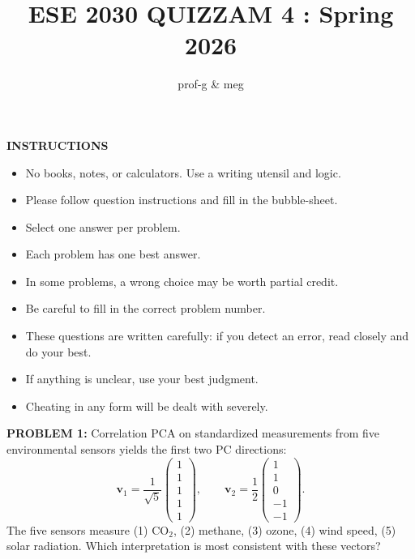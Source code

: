 \documentclass[12pt]{amsart}
\title{ESE 2030 QUIZZAM 4 : Spring 2026}
\author{prof-g \& meg}
\begin{document}
\maketitle

\begin{center}
    {\bf INSTRUCTIONS}
\end{center}

\begin{itemize}
\item 
No books, notes, or calculators. Use a writing utensil and logic. 

\item 
Please follow question instructions and fill in the bubble-sheet. 

\item 
Select one answer per problem.

\item 
Each problem has one best answer. 

\item 
In some problems, a wrong choice may be worth partial credit. 

\item 
Be careful to fill in the correct problem number. 

\item 
These questions are written carefully: if you detect an error, read closely and do your best.

\item 
If anything is unclear, use your best judgment. 

\item 
Cheating in any form will be dealt with severely. 
\end{itemize}

\newpage





{\bf PROBLEM 1:}
Correlation PCA on standardized measurements from five environmental sensors yields the first two PC directions:
$$\mathbf{v}_1 = \frac{1}{\sqrt{5}}\begin{pmatrix} 1 \\ 1 \\ 1 \\ 1 \\ 1 \end{pmatrix}, \qquad \mathbf{v}_2 = \frac{1}{2}\begin{pmatrix} 1 \\ 1 \\ 0 \\ -1 \\ -1 \end{pmatrix}.$$
%
The five sensors measure (1) $\mathrm{CO}_2$, (2) methane, (3) ozone, (4) wind speed, (5) solar radiation.
%
Which interpretation is most consistent with these vectors?
\end{document}
